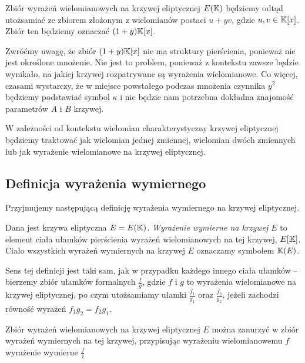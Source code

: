 \begin{remark}
Zbiór wyrażeń wielomianowych na krzywej eliptycznej $E(\mathbb{K})$
będziemy odtąd utożsamiać ze zbiorem
złożonym z wielomianów postaci $u + yv$,
gdzie $u, v \in \mathbb{K}[x]$.
Zbiór ten będziemy oznaczać $(1 + y)\mathbb{K}[x]$.
\end{remark}

Zwróćmy uwagę, że zbiór $(1 + y)\mathbb{K}[x]$ nie ma struktury pierścienia,
ponieważ nie jest określone mnożenie.
Nie jest to problem,
ponieważ z kontekstu zawsze będzie wynikało,
na jakiej krzywej rozpatrywane są wyrażenia wielomianowe.
Co więcej, czasami wystarczy,
że w miejsce powstałego podczas mnożenia czynnika $y^2$
będziemy podstawiać symbol $\kappa$
i nie będzie nam potrzebna dokładna znajomość parametrów $A$ i $B$ krzywej.

\begin{remark}
W zależności od kontekstu wielomian charakterystyczny krzywej eliptycznej
będziemy traktować jak wielomian jednej zmiennej, wielomian dwóch zmiennych
lub jak wyrażenie wielomianowe na krzywej eliptycznej.
\end{remark}

\subsection*{Definicja wyrażenia wymiernego}

Przyjmujemy następującą definicję
wyrażenia wymiernego na krzywej eliptycznej.

\begin{definition}
Dana jest krzywa eliptyczna $E = E(\mathbb{K})$.
\emph{Wyrażenie wymierne na krzywej $E$}
to element ciała ułamków
pierścienia wyrażeń wielomianowych na tej krzywej, $E[\mathbb{K}]$.
Ciało wszystkich wyrażeń wymiernych na krzywej $E$
oznaczamy symbolem $\mathbb{K}(E)$.
\end{definition}

Sens tej definicji jest taki sam,
jak w przypadku każdego innego ciała ułamków --
bierzemy zbiór ułamków formalnych $\frac{f}{g}$,
gdzie $f$ i $g$ to wyrażenia wielomianowe na krzywej eliptycznej,
po czym utożsamiamy ułamki $\frac{f_1}{g_1}$ oraz $\frac{f_2}{g_2}$,
jeżeli zachodzi równość wyrażeń $f_1g_2 = f_2g_1$.

\begin{fact}
Zbiór wyrażeń wielomianowych na krzywej eliptycznej $E$
można zanurzyć w zbiór wyrażeń wymiernych na tej krzywej,
przypisując wyrażeniu wielomianowemu $f$ wyrażenie wymierne $\frac{f}{1}$
\end{fact}

